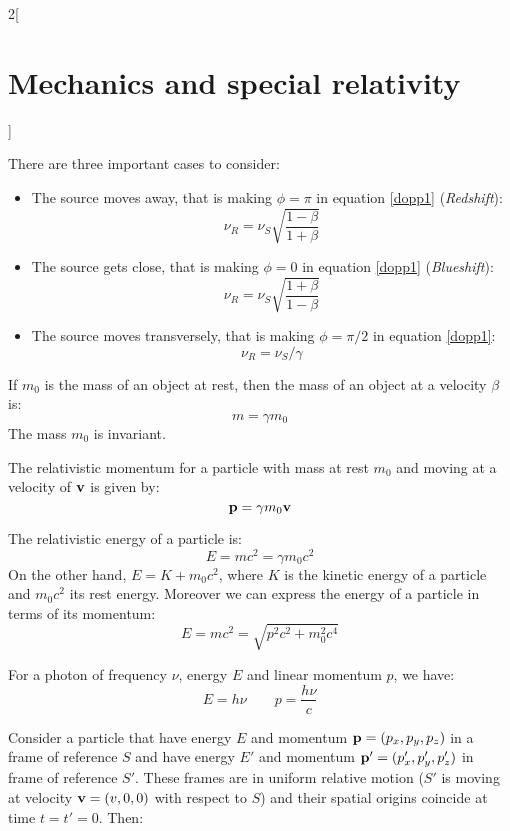 \documentclass[../../../main.tex]{subfiles}
\begin{document}
\begin{multicols}{2}[\section{Mechanics and special relativity}]
\begin{center}
\begin{minipage}{\linewidth}
    \end{minipage}
  \end{center}
  \begin{corollary}
    There are three important cases to consider:
    \begin{itemize}
      \item The source moves away, that is making $\phi=\pi$ in equation \eqref{dopp1} (\textit{Redshift}):
            $$\nu_R=\nu_S\sqrt{\frac{1-\beta}{1+\beta}}$$
      \item The source gets close, that is making $\phi=0$ in equation \eqref{dopp1} (\textit{Blueshift}):
            $$\nu_R=\nu_S\sqrt{\frac{1+\beta}{1-\beta}}$$
      \item The source moves transversely, that is making $\phi=\pi/2$ in equation \eqref{dopp1}:$$\nu_R=\nu_S/\gamma$$
    \end{itemize}
  \end{corollary}
  \begin{prop}
    If $m_0$ is the mass of an object at rest, then the mass of an object at a velocity $\beta$ is: $$m=\gamma m_0$$ The mass $m_0$ is invariant.
  \end{prop}
  \begin{prop}
    The relativistic momentum for a particle with mass at rest $m_0$ and moving at a velocity of $\boldsymbol{\mathrm{v}}$ is given by: $$\boldsymbol{\mathrm{p}}=\gamma m_0\boldsymbol{\mathrm{v}}$$
  \end{prop}
  \begin{prop}
    The relativistic energy of a particle is: $$E=mc^2=\gamma m_0c^2$$ On the other hand, $E=K+m_0c^2$, where $K$ is the kinetic energy of a particle and $m_0c^2$ its rest energy. Moreover we can express the energy of a particle in terms of its momentum:
    $$E=mc^2=\sqrt{p^2c^2+m_0^2c^4}$$
  \end{prop}
  \begin{prop}
    For a photon of frequency $\nu$, energy $E$ and linear momentum $p$, we have:
    $$E=h\nu\qquad p=\frac{h\nu}{c}$$
  \end{prop}
  \begin{prop}
    Consider a particle that have energy $E$ and momentum $\boldsymbol{\mathrm{p}}=(p_x,p_y,p_z)$ in a frame of reference $S$ and have energy $E'$ and momentum $\boldsymbol{\mathrm{p}}'=(p_x',p_y',p_z')$ in frame of reference $S'$. These frames are in uniform relative motion ($S'$ is moving at velocity $\boldsymbol{\mathrm{v}}=(v,0,0)$ with respect to $S$) and their spatial origins coincide at time $t=t'=0$. Then:

\end{prop}
\end{multicols}
\end{document}
